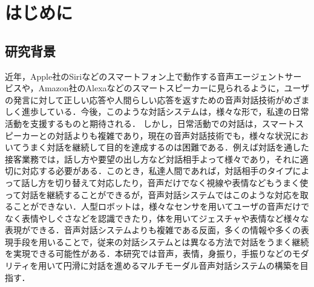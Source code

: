 \section{はじめに}
\label{はじめに}

\subsection{研究背景}
\label{研究背景}
近年，Apple社のSiriなどのスマートフォン上で動作する音声エージェントサービスや，Amazon社のAlexaなどのスマートスピーカーに見られるように，ユーザの発言に対して正しい応答や人間らしい応答を返すための音声対話技術がめざましく進歩している．今後，このような対話システムは，様々な形で，私達の日常活動を支援するものと期待される．\cite{kikiyaku2012} \cite{koreisya2000}しかし，日常活動での対話は，スマートスピーカーとの対話よりも複雑であり，現在の音声対話技術でも，様々な状況においてうまく対話を継続して目的を達成するのは困難である\cite{hitask2016}．例えば対話を通した接客業務では，話し方や要望の出し方など対話相手よって様々であり，それに適切に対応する必要がある．このとき，私達人間であれば，対話相手のタイプによって話し方を切り替えて対応したり，音声だけでなく視線や表情などもうまく使って対話を継続することができるが，音声対話システムではこのような対応を取ることができない．人型ロボットは，様々なセンサを用いてユーザの音声だけでなく表情やしぐさなどを認識できたり，体を用いてジェスチャや表情など様々な表現ができる．音声対話システムよりも複雑である反面，多くの情報や多くの表現手段を用いることで，従来の対話システムとは異なる方法で対話をうまく継続を実現できる可能性がある．本研究では音声，表情，身振り，手振りなどのモダリティを用いて円滑に対話を進めるマルチモーダル音声対話システムの構築を目指す．

